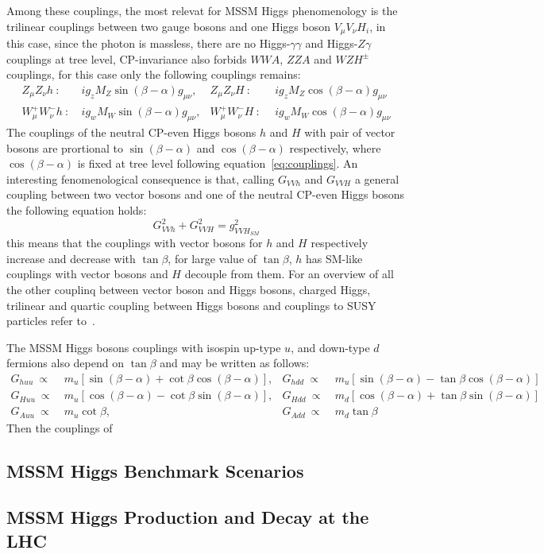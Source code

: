 Among these couplings, the most relevat for MSSM Higgs phenomenology is the trilinear couplings between two gauge bosons and one Higgs boson $V_{\mu}V_{\nu}H_i$,
in this case, since the photon is massless, there are no Higgs-$\gamma\gamma$ and Higgs-$Z\gamma$ couplings at tree level, CP-invariance also forbids $WWA$, $ZZA$
and $WZH^{\pm}$ couplings, for this case only the following couplings remains:
\begin{align} \label{eq:couplings}
Z_{\mu}Z_{\nu} h ~ :  ~ & ig_z M_Z \sin(\beta -\alpha) g_{\mu\nu},  &  Z_{\mu}Z_{\nu} H ~ : ~  ~    & ig_z M_Z \cos(\beta -\alpha) g_{\mu\nu} \\
W_{\mu}^+W_{\nu}^- h ~: ~&  ig_w M_W \sin(\beta -\alpha) g_{\mu\nu},  &  W_{\mu}^+W_{\nu}^- H ~ : ~ ~ & ig_w M_W \cos(\beta -\alpha) g_{\mu\nu}
\end{align}
The couplings of the neutral CP-even Higgs bosons $h$ and $H$ with pair of vector bosons are prortional to $ \sin(\beta -\alpha)$ and $\cos(\beta -\alpha)$
respectively, where $\cos(\beta -\alpha)$ is fixed at tree level following equation~\eqref{eq:couplings}. An interesting fenomenological consequence is
that, calling $G_{VVh}$ and $G_{VVH}$ a general   coupling between two vector bosons and one of the neutral CP-even Higgs bosons the following equation holds:
\begin{equation}\label{eq:couplingSM}
G^2_{VVh} +G^2_{VVH} = g^2_{VVH_{SM}}
\end{equation}
this means that the couplings with vector bosons for $h$ and $H$ respectively increase and decrease with $\tan\beta$, for
large value of $\tan\beta$, $h$ has SM-like couplings with vector bosons and $H$  decouple from them. For an overview of all the other
couplinq between vector boson and Higgs bosons, charged Higgs, trilinear and quartic coupling between Higgs bosons and couplings 
to SUSY particles refer to~\cite{Djuadi}.

The MSSM Higgs bosons couplings with isospin up-type $u$, and down-type $d$ fermions also depend on $\tan\beta$ and may be written
as follows:
\begin{align*}
G_{huu} ~\propto ~ & m_u [\sin(\beta - \alpha)  + \cot\beta \cos(\beta - \alpha)], & G_{hdd} ~\propto ~ & m_u [\sin(\beta - \alpha)  - \tan\beta \cos(\beta - \alpha)]\\
G_{Huu} ~\propto ~& m_u [\cos(\beta - \alpha)  - \cot\beta \sin(\beta - \alpha)], & G_{Hdd} ~\propto~  & m_d [\cos(\beta - \alpha)  + \tan\beta \sin(\beta - \alpha)]\\
G_{Auu} ~ \propto ~ & m_u  \cot\beta, & G_{Add} ~ \propto ~ & m_d \tan\beta 
\end{align*} 
Then the couplings of 




\subsection{MSSM Higgs Benchmark Scenarios}

\subsection{MSSM Higgs Production and Decay at the LHC}


